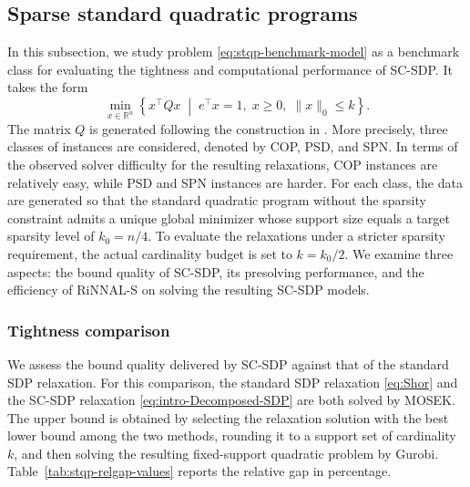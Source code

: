 \documentclass[11pt]{article}
\def\R{\mathbb{R}}
\theoremstyle{plain}
\begin{document}
\subsection{Sparse standard quadratic programs}\label{subsec:numexp-stqp-compare}

In this subsection, we study problem \eqref{eq:stqp-benchmark-model} as a benchmark class for evaluating the tightness and computational performance of SC-SDP. It takes the form
\begingroup
\renewcommand{\theequation}{S-StQP}
\begin{equation}\label{eq:stqp-benchmark-model}
\min_{x\in\R^n}
\left\{
x^\top Q x
\;\middle|\;
e^\top x = 1,\;
x\ge 0,\;
\|x\|_0\le k
\right\}.\tag{S-StQP}
\end{equation}
\endgroup
The matrix $Q$ is generated following the construction in \cite{bomze2025tighter,RiNNALplus}. More precisely, three classes of instances are considered, denoted by COP, PSD, and SPN. In terms of the observed solver difficulty for the resulting relaxations, COP instances are relatively easy, while PSD and SPN instances are harder. For each class, the data are generated so that the standard quadratic program without the sparsity constraint admits a unique global minimizer whose support size equals a target sparsity level of $k_0=n/4$. To evaluate the relaxations under a stricter sparsity requirement, the actual cardinality budget is set to $k=k_0/2$. {We examine three aspects: the bound quality of SC-SDP, its presolving performance, and the efficiency of RiNNAL-S on solving the resulting SC-SDP models.}

\subsubsection{Tightness comparison}\label{subsubsec:stqp-tightness-comparison}

We assess the bound quality delivered by SC-SDP against that of the standard SDP relaxation. For this comparison, the standard SDP relaxation \eqref{eq:Shor} and the SC-SDP relaxation \eqref{eq:intro-Decomposed-SDP} are both solved by MOSEK. The upper bound is obtained by selecting the relaxation solution with the best lower bound among the two methods, rounding it to a support set of cardinality $k$, and then solving the resulting fixed-support quadratic problem by Gurobi. Table~\ref{tab:stqp-relgap-values} reports the relative gap in percentage.
\end{document}
